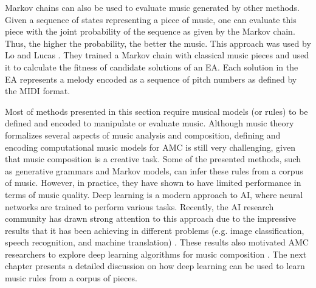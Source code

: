 Markov chains can also be used to evaluate music generated by other methods. Given a sequence of states representing a piece of music, one can evaluate this piece with the joint probability of the sequence as given by the Markov chain. Thus, the higher the probability, the better the music. This approach was used by Lo and Lucas \cite{lo2006evolving}. They trained a Markov chain with classical music pieces and used it to calculate the fitness of candidate solutions of an EA. Each solution in the EA represents a melody encoded as a sequence of pitch numbers as defined by the MIDI format.

Most of methods presented in this section require musical models (or rules) to be defined and encoded
to manipulate or evaluate music. Although music theory formalizes several aspects of music analysis and composition, defining and encoding computational music models for AMC is still very challenging, given that music composition is a creative task. Some of the presented methods, such as generative grammars and Markov models, can infer these rules from a corpus of music. However, in practice, they have shown to have limited performance in terms of music quality. Deep learning is a modern approach to AI, where neural networks are trained to perform various tasks. Recently, the AI research community has drawn strong attention to this approach due to the impressive results that it has been achieving in different problems
(e.g. image classification, speech recognition, and machine translation) \cite{lecun2015deep}. These results also motivated AMC researchers to explore deep learning algorithms for music composition \cite{briot2017deep}. The next chapter presents a detailed discussion on how deep learning can be used to learn music rules from a corpus of pieces.
